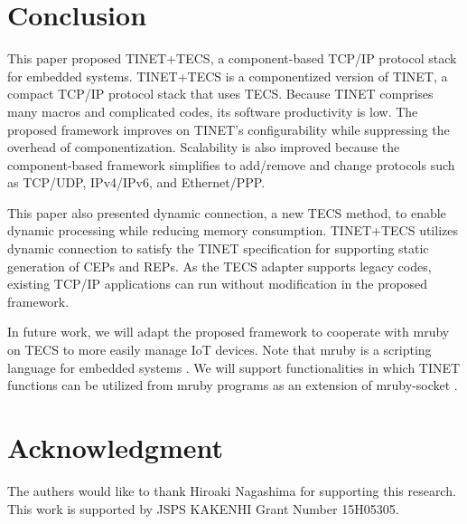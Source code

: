\documentclass[conference]{IEEEtran/IEEEtran}
\begin{document}

\section{Conclusion}
\label{sec:Conclusion}

This paper proposed TINET+TECS, a component-based TCP/IP protocol stack for embedded systems.
TINET+TECS is a componentized version of TINET, a compact TCP/IP protocol stack that uses TECS.
Because TINET comprises many macros and complicated codes, its software productivity is low.
The proposed framework improves on TINET's configurability while suppressing the overhead of componentization.
Scalability is also improved because the component-based framework simplifies to add/remove and change protocols such as TCP/UDP, IPv4/IPv6, and Ethernet/PPP.

This paper also presented dynamic connection, a new TECS method, to enable dynamic processing while reducing memory consumption.
TINET+TECS utilizes dynamic connection to satisfy the TINET specification for supporting static generation of CEPs and REPs.
As the TECS adapter supports legacy codes, existing TCP/IP applications can run without modification in the proposed framework.

In future work, we will adapt the proposed framework to cooperate with mruby on TECS \cite{par:mrubyonTECS} to more easily manage IoT devices.
Note that mruby is a scripting language for embedded systems \cite{par:mruby}.
We will support functionalities in which TINET functions can be utilized from mruby programs as an extension of mruby-socket \cite{url:mruby-library}.
    


\section*{Acknowledgment}

The authers would like to thank Hiroaki Nagashima for supporting this research.
This work is supported by JSPS KAKENHI Grant Number 15H05305.





\end{document}
